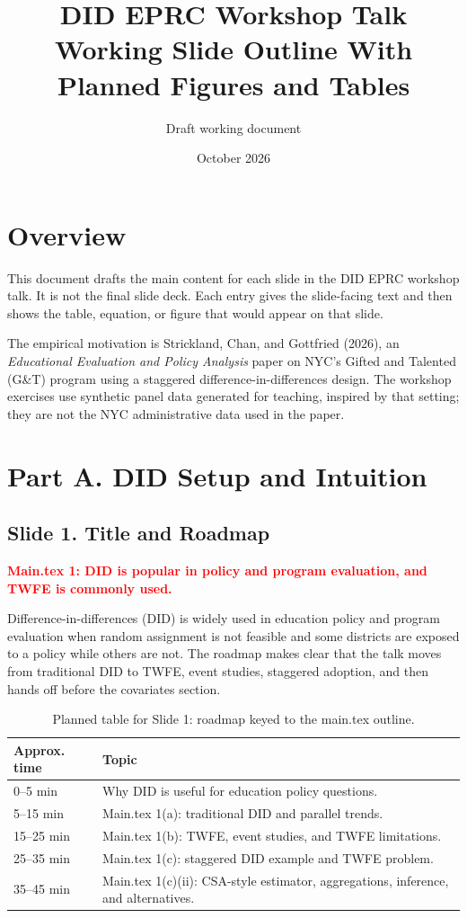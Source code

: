 \documentclass[11pt]{article}
\title{\textbf{DID EPRC Workshop Talk}\\
\large Working Slide Outline With Planned Figures and Tables}
\author{Draft working document}
\date{October 2026}
\newcommand{\slideheading}[2]{%
  \subsection*{Slide #1. #2}
}
\newcommand{\slidecontent}[1]{#1}
\newcommand{\mainpoint}[1]{%
  \slidecontent{\textcolor{red}{\textbf{Main.tex #1}}}
}
\begin{document}
\maketitle

\section*{Overview}

This document drafts the main content for each slide in the DID EPRC workshop
talk. It is not the final slide deck. Each entry gives the slide-facing text and
then shows the table, equation, or figure that would appear on that slide.

The empirical motivation is Strickland, Chan, and Gottfried (2026), an
\emph{Educational Evaluation and Policy Analysis} paper on NYC's Gifted and
Talented (G\&T) program using a staggered difference-in-differences design. The
workshop exercises use synthetic panel data generated for teaching, inspired by
that setting; they are not the NYC administrative data used in the paper.

\section*{Part A. DID Setup and Intuition}

\slideheading{1}{Title and Roadmap}
\mainpoint{1: DID is popular in policy and program evaluation, and TWFE is commonly used.}

\slidecontent{Difference-in-differences (DID) is widely used in education
policy and program evaluation when random assignment is not feasible and some
districts are exposed to a policy while others are not. The roadmap makes clear
that the talk moves from traditional DID to TWFE, event studies, staggered
adoption, and then hands off before the covariates section.}

\begin{table}[H]
\centering
\small
\begin{tabular}{p{}p{}}
\toprule
\textbf{Approx. time} & \textbf{Topic} \\
\midrule
0--5 min & Why DID is useful for education policy questions. \\
5--15 min & Main.tex 1(a): traditional DID and parallel trends. \\
15--25 min & Main.tex 1(b): TWFE, event studies, and TWFE limitations. \\
25--35 min & Main.tex 1(c): staggered DID example and TWFE problem. \\
35--45 min & Main.tex 1(c)(ii): CSA-style estimator, aggregations, inference, and alternatives. \\
\bottomrule
\end{tabular}
\caption*{\footnotesize Planned table for Slide 1: roadmap keyed to the main.tex outline.}
\end{table}
\end{document}
